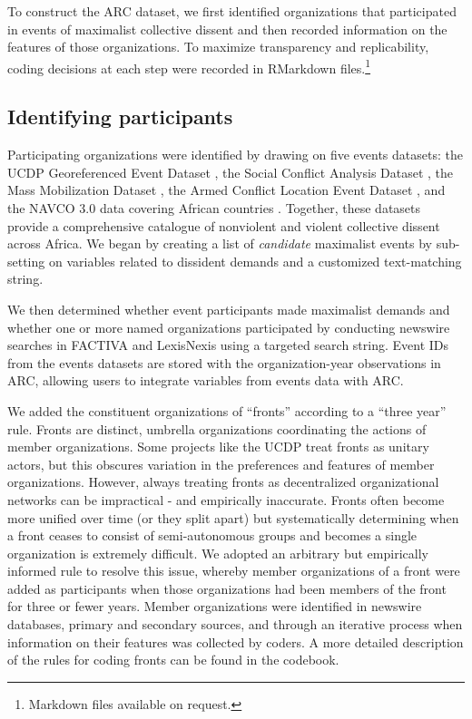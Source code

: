 To construct the ARC dataset, we first identified organizations that
participated in events of maximalist collective dissent and then recorded
information on the features of those organizations. To maximize transparency and
replicability, coding decisions at each step were recorded in RMarkdown
files.\footnote{Markdown files available on request.}

\subsection{Identifying participants}

Participating organizations were identified by drawing on five events datasets:
the UCDP Georeferenced Event Dataset \citep{Sundberg2013}, the Social Conflict
Analysis Dataset \citep{Salehyan2012}, the Mass Mobilization Dataset
\citep{Clark2021}, the Armed Conflict Location Event Dataset
\citep{Raleigh2010}, and the NAVCO 3.0 data covering African countries
\citep{Chenoweth2018}. Together, these datasets provide a comprehensive
catalogue of nonviolent and violent collective dissent across Africa. We began
by creating a list of \emph{candidate} maximalist events by sub-setting on
variables related to dissident demands and a customized text-matching string. 

We then determined whether event participants made maximalist demands and
whether one or more named organizations participated by conducting newswire
searches in FACTIVA and LexisNexis using a targeted search string. Event IDs
from the events datasets are stored with the organization-year observations in
ARC, allowing users to integrate variables from events data with ARC. 

We added the constituent organizations of ``fronts'' according to a ``three
year'' rule. Fronts are distinct, umbrella organizations coordinating the
actions of member organizations. Some projects like the UCDP treat fronts as
unitary actors, but this obscures variation in the preferences and features of
member organizations. However, always treating fronts as decentralized
organizational networks can be impractical - and empirically inaccurate. Fronts
often become more unified over time (or they split apart) but systematically
determining when a front ceases to consist of semi-autonomous groups and becomes
a single organization is extremely difficult. We adopted an arbitrary but
empirically informed rule to resolve this issue, whereby member organizations of
a front were added as participants when those organizations had been members of
the front for three or fewer years. Member organizations were identified in
newswire databases, primary and secondary sources, and through an iterative
process when information on their features was collected by coders.  A more
detailed description of the rules for coding fronts can be found in the
codebook. 

